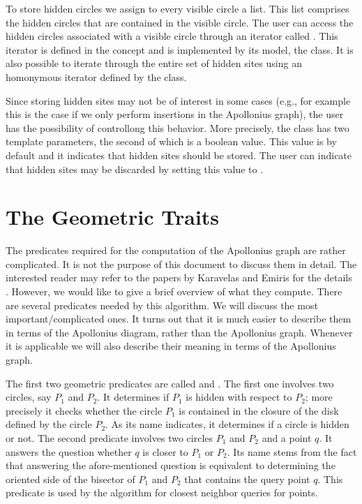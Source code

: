 {To store hidden circles we assign to every visible circle a list. This
list comprises the hidden circles that are contained in the
visible circle. The user can access the hidden circles associated with
a visible circle through an iterator called
. This iterator is defined in the
 concept and is implemented by its
model, the 
class. It is also possible to iterate through the entire set of hidden
sites using an homonymous iterator defined by the
 class. 

Since storing hidden sites may not be of interest in some cases (e.g.,
for example this is the case if we only perform insertions in the
Apollonius graph), the user has the possibility of controllong this
behavior. More precisely, the class
 has two template
parameters, the second of which is a boolean value. This value is by
default  and it indicates that hidden sites should be
stored. The user can indicate that hidden sites may be discarded
by setting this value to .


\section{The Geometric Traits}
\label{sec:apollonius2-traits}

The predicates required for the computation of the Apollonius graph
are rather complicated. It is not the purpose of this document to
discuss them in detail. The interested reader may refer to the papers
by Karavelas and Emiris for the details
\cite{cgal:ke-ppawv-02,ke-rctac-03}. However, we would like to give a brief
overview of what they 
compute. There are several predicates needed by this algorithm. We
will discuss the most important/complicated ones. It turns out that
it is much easier to describe them in terms of the Apollonius diagram,
rather than the Apollonius graph. Whenever it is applicable we will also
describe their meaning in terms of the Apollonius graph.


The first two geometric predicates are called
 and . The first one
involves two circles, say $P_1$ and $P_2$. It determines if $P_1$ is
hidden with respect to $P_2$; more precisely it checks whether the
circle $P_1$ is contained in the closure of the disk defined by the
circle $P_2$. As its name indicates, it determines if a circle is
hidden or not. The second predicate involves two circles $P_1$ and
$P_2$ and a point $q$. It answers the question whether $q$ is closer
to $P_1$ or $P_2$. Its name stems from the fact that answering the
afore-mentioned question is equivalent to determining the oriented
side of the bisector of $P_1$ and $P_2$ that contains the query point
$q$. This predicate is used by the algorithm for closest neighbor
queries for points.


}
